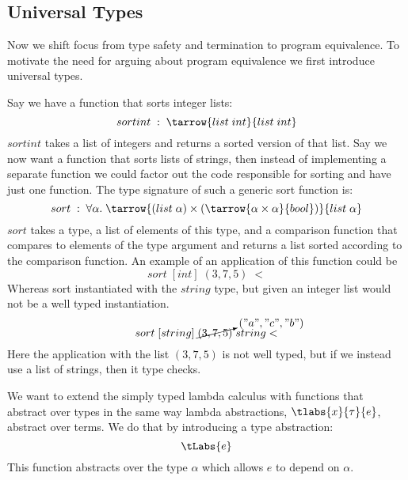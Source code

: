 \subsection*{Universal Types}
Now we shift focus from type safety and termination to program equivalence. To motivate the need for arguing about program equivalence we first introduce universal types.

Say we have a function that sorts integer lists:
\[
  sortint \; : \; \tarrow{list \; int}{list \; int}
\]
$sortint$ takes a list of integers and returns a sorted version of that list. Say we now want a function that sorts lists of strings, then instead of implementing a separate function we could factor out the code responsible for sorting and have just one function. The type signature of such a generic sort function is:
\[
  sort \; : \; \forall \alpha.\; \tarrow{(list \; \alpha) \times (\tarrow{\alpha \times \alpha}{bool} )}{list \; \alpha}
\]
$sort$ takes a type, a list of elements of this type, and a comparison function that compares to elements of the type argument and returns a list sorted according to the comparison function. An example of an application of this function could be
\[
  sort \; [int] \; (3,7,5) \; <
\]
Whereas sort instantiated with the $string$ type, but given an integer list would not be a well typed instantiation.
\[
  sort \; [string] \; \cancelto{("a","c","b")}{(3,7,5)} \; string<
\]%
Here the application with the list $(3,7,5)$ is not well typed, but if we instead use a list of strings, then it type checks.

We want to extend the simply typed lambda calculus with functions that abstract over types in the same way lambda abstractions, $\tlabs{x}{\tau}{e}$, abstract over terms. We do that by introducing a type abstraction:
\[
  \tLabs{e}
\]
This function abstracts over the type $\alpha$ which allows $e$ to depend on $\alpha$.

